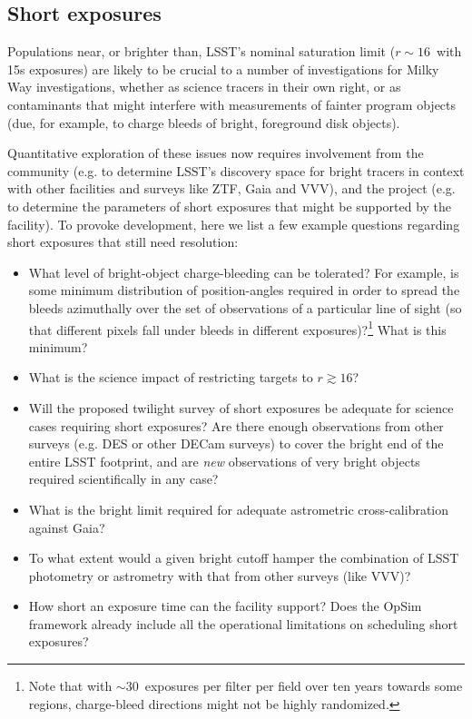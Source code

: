 \subsection{Short exposures}

  Populations near, or brighter than, LSST's nominal saturation
  limit ($r \sim 16$~with 15s exposures) are likely to be crucial to a
  number of investigations for Milky Way investigations, whether as
  science tracers in their own right, or as contaminants that might
  interfere with measurements of fainter program objects (due, for
  example, to charge bleeds of bright, foreground disk objects).

  Quantitative exploration of these issues now requires involvement from
  the community (e.g. to determine LSST's discovery space for bright
  tracers in context with other facilities and surveys like ZTF, Gaia
  and VVV), and the project (e.g. to determine the parameters of short
  exposures that might be supported by the facility). To provoke
  development, here we list a few example questions regarding short
  exposures that still need resolution:

\begin{itemize}
  \item{What level of bright-object charge-bleeding can be tolerated? For example, is some minimum distribution of position-angles required in order to spread the bleeds azimuthally over the set of observations of a particular line of sight (so that different pixels fall under bleeds in different exposures)?\footnote{Note that with $\sim 30$~exposures per filter per field over ten years towards some regions, charge-bleed directions might not be highly randomized.} What is this minimum?}
    \item{What is the science impact of restricting targets to $r \gtrsim 16$?}
      \item{Will the proposed twilight survey of short exposures be adequate for science cases requiring short exposures? Are there enough observations from other surveys (e.g. DES or other DECam surveys) to cover the bright end of the entire LSST footprint, and are {\it new} observations of very bright objects required scientifically in any case?}
        \item{What is the bright limit required for adequate astrometric cross-calibration against Gaia?}
          \item{To what extent would a given bright cutoff hamper the combination of LSST photometry or astrometry with that from other surveys (like VVV)?}
          \item{How short an exposure time can the facility support? Does the OpSim framework already include all the operational limitations on scheduling short exposures?}
\end{itemize}


